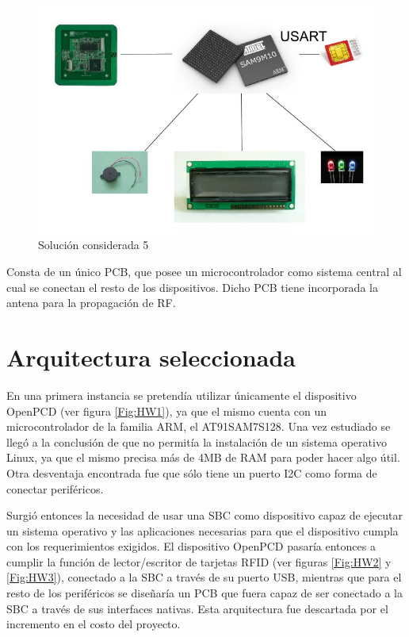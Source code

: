 \begin{itemize}
\begin{figure}[H]
\centering
  \begin{center}
  \includegraphics[scale=.25]{Imagenes/4.jpg} 
  \end{center}
  \caption{Solución considerada 5}\label{Fig:HW5} 
\end{figure}

Consta de un único PCB, que posee un microcontrolador como sistema central al cual se
conectan el resto de los dispositivos. Dicho PCB tiene incorporada la antena para la
propagación de RF.

\end{itemize}

\section{Arquitectura seleccionada}
En una primera instancia se pretendía utilizar únicamente el dispositivo OpenPCD (ver figura \ref{Fig:HW1}), ya que el mismo cuenta con un microcontrolador de la familia ARM, el AT91SAM7S128. Una vez estudiado se llegó a la conclusión de que no permitía la instalación de un sistema operativo Linux, ya que el mismo precisa más de 4MB de RAM para poder hacer algo útil. Otra desventaja encontrada fue que sólo tiene un puerto I2C como forma de conectar periféricos.

Surgió entonces la necesidad de usar una SBC como dispositivo capaz de ejecutar un sistema operativo y las aplicaciones necesarias para que el dispositivo cumpla con los requerimientos exigidos. El dispositivo OpenPCD pasaría entonces a cumplir la función de lector/escritor de tarjetas RFID (ver figuras \ref{Fig:HW2} y \ref{Fig:HW3}), conectado a la SBC a través de su puerto USB, mientras que para el resto de los periféricos se diseñaría un PCB que fuera capaz de ser conectado a la SBC a través de sus interfaces nativas. Esta arquitectura fue descartada por el incremento en el costo del proyecto.

